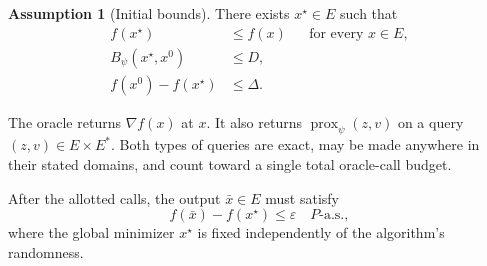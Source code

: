 \documentclass[10pt]{article}
\theoremstyle{definition}
\newtheorem{assumption}{Assumption}
\begin{document}
\begin{assumption}[Initial bounds]
There exists $x^\star\in E$ such that
\[
\begin{aligned}
f(x^\star)&\leq f(x) &&\text{for every }x\in E,\\
B_\psi(x^\star,x^0)&\leq D,\\
f(x^0)-f(x^\star)&\leq\Delta.
\end{aligned}
\]
\end{assumption}

The oracle returns $\nabla f(x)$ at $x$. It also returns $\operatorname{prox}_\psi(z,v)$ on a query $(z,v)\in E\times E^*$. Both types of queries are exact, may be made anywhere in their stated domains, and count toward a single total oracle-call budget.

After the allotted calls, the output $\bar{x}\in E$ must satisfy
\[
f(\bar{x})-f(x^\star)\leq\varepsilon
\quad P\text{-a.s.},
\]
where the global minimizer $x^\star$ is fixed independently of the algorithm's randomness.
\end{document}
